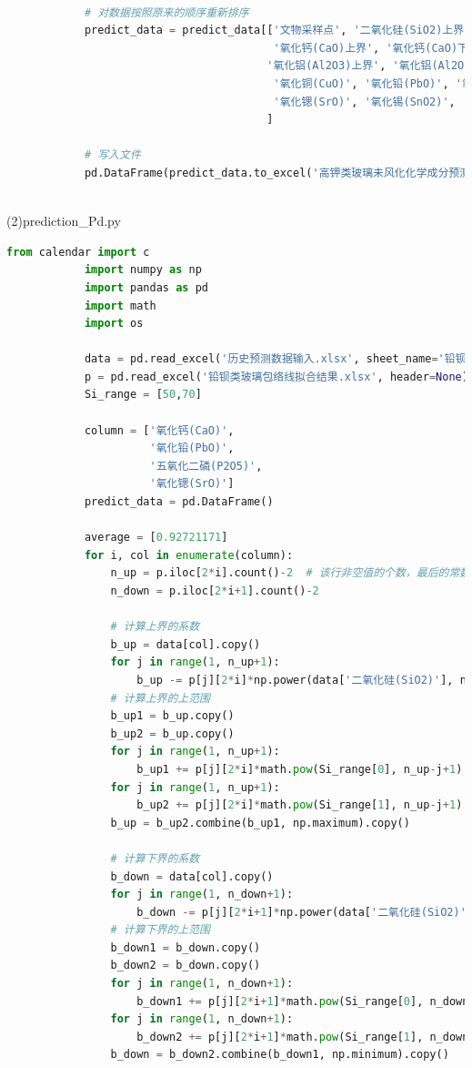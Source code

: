 \documentclass[withoutpreface,bwprint]{cumcmthesis}
\begin{document}
\begin{appendices}
\begin{lstlisting}[language=Python]
			
			# 对数据按照原来的顺序重新排序
			predict_data = predict_data[['文物采样点', '二氧化硅(SiO2)上界', '二氧化硅(SiO2)下界', '氧化钠(Na2O)', '氧化钾(K2O)上界', '氧化钾(K2O)下界',
										 '氧化钙(CaO)上界', '氧化钙(CaO)下界', '氧化镁(MgO)',
										'氧化铝(Al2O3)上界', '氧化铝(Al2O3)下界', '氧化铁(Fe2O3)上界', '氧化铁(Fe2O3)下界',
										 '氧化铜(CuO)', '氧化铅(PbO)', '氧化钡(BaO)', '五氧化二磷(P2O5)',
										 '氧化锶(SrO)', '氧化锡(SnO2)', '二氧化硫(SO2)']
										]
			
			# 写入文件
			pd.DataFrame(predict_data.to_excel('高钾类玻璃未风化化学成分预测结果.xlsx'))
			
		\end{lstlisting}

		(2)prediction\_Pd.py
		\begin{lstlisting}[language=Python]
			from calendar import c
			import numpy as np
			import pandas as pd
			import math
			import os
			
			data = pd.read_excel('历史预测数据输入.xlsx', sheet_name='铅钡风化待预测')
			p = pd.read_excel('铅钡类玻璃包络线拟合结果.xlsx', header=None)  # p为待拟合的参数
			Si_range = [50,70]
			
			column = ['氧化钙(CaO)',
					  '氧化铅(PbO)',
					  '五氧化二磷(P2O5)',
					  '氧化锶(SrO)']
			predict_data = pd.DataFrame()
			
			average = [0.92721171]
			for i, col in enumerate(column):
				n_up = p.iloc[2*i].count()-2  # 该行非空值的个数，最后的常数项重新计算
				n_down = p.iloc[2*i+1].count()-2
			
				# 计算上界的系数
				b_up = data[col].copy()
				for j in range(1, n_up+1):
					b_up -= p[j][2*i]*np.power(data['二氧化硅(SiO2)'], n_up-j+1)
				# 计算上界的上范围
				b_up1 = b_up.copy()
				b_up2 = b_up.copy()
				for j in range(1, n_up+1):
					b_up1 += p[j][2*i]*math.pow(Si_range[0], n_up-j+1)
				for j in range(1, n_up+1):
					b_up2 += p[j][2*i]*math.pow(Si_range[1], n_up-j+1)
				b_up = b_up2.combine(b_up1, np.maximum).copy()
			
				# 计算下界的系数
				b_down = data[col].copy()
				for j in range(1, n_down+1):
					b_down -= p[j][2*i+1]*np.power(data['二氧化硅(SiO2)'], n_down-j+1)
				# 计算下界的上范围
				b_down1 = b_down.copy()
				b_down2 = b_down.copy()
				for j in range(1, n_down+1):
					b_down1 += p[j][2*i+1]*math.pow(Si_range[0], n_down-j+1)
				for j in range(1, n_down+1):
					b_down2 += p[j][2*i+1]*math.pow(Si_range[1], n_down-j+1)
				b_down = b_down2.combine(b_down1, np.minimum).copy()
			

\end{lstlisting}
\end{appendices}
\end{document}
